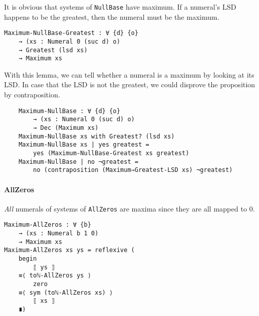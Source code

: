 \documentclass[\main/thesis.tex]{subfiles}
\begin{document}
It is obvious that systems of {\lstinline|NullBase|} have maximum.
If a numeral's LSD happens to be the greatest,
then the numeral must be the maximum.

\begin{lstlisting}
Maximum-NullBase-Greatest : ∀ {d} {o}
    → (xs : Numeral 0 (suc d) o)
    → Greatest (lsd xs)
    → Maximum xs
\end{lstlisting}

With this lemma, we can tell whether a numeral is a maximum by looking at its
LSD. In case that the LSD is not the greatest, we could disprove the proposition
by contraposition.

\begin{lstlisting}
    Maximum-NullBase : ∀ {d} {o}
        → (xs : Numeral 0 (suc d) o)
        → Dec (Maximum xs)
    Maximum-NullBase xs with Greatest? (lsd xs)
    Maximum-NullBase xs | yes greatest =
        yes (Maximum-NullBase-Greatest xs greatest)
    Maximum-NullBase | no ¬greatest =
        no (contraposition (Maximum⇒Greatest-LSD xs) ¬greatest)
\end{lstlisting}

\paragraph{AllZeros}

\begin{center}
    \begin{adjustbox}{max width=\textwidth}
    \end{adjustbox}
\end{center}

\textit{All} numerals of systems of {\lstinline|AllZeros|} are maxima since they
are all mapped to $ 0 $.

\begin{lstlisting}
Maximum-AllZeros : ∀ {b}
    → (xs : Numeral b 1 0)
    → Maximum xs
Maximum-AllZeros xs ys = reflexive (
    begin
        ⟦ ys ⟧
    ≡⟨ toℕ-AllZeros ys ⟩
        zero
    ≡⟨ sym (toℕ-AllZeros xs) ⟩
        ⟦ xs ⟧
    ∎)
\end{lstlisting}
\end{document}
